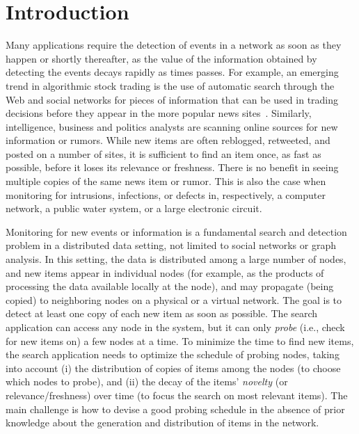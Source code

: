 \section{Introduction}\label{sec:introduction}
Many applications require the detection of events in a network as soon as they
happen or shortly thereafter, as the value of the information obtained by
detecting the events decays rapidly as times passes. For example, an emerging
trend in algorithmic stock trading is the use of automatic search through the
Web and social networks for pieces of information that can be used in trading
decisions before they appear in the more popular news
sites~\citep{Delaney2009,latar2015robot,wallstreet2015,McKinney2011}. Similarly,
intelligence, business and politics analysts are scanning online sources for new
information or rumors. While new items are often reblogged, retweeted, and
posted on a number of sites, it is sufficient to find an item once, as fast as
possible, before it loses its relevance or freshness. There is no benefit in seeing multiple
copies of the same news item or rumor. This is also the case when monitoring for
intrusions, infections, or defects in, respectively, a computer network, a
public water system, or a large electronic circuit.

Monitoring for new events or information is a fundamental search and detection
problem in a distributed data setting, not limited to social networks or graph
analysis. In this setting, the data is distributed among a large number of
nodes, and new items appear in individual nodes (for example, as the products of
processing the data available locally at the node), and may propagate (being
copied) to neighboring nodes on a physical or a virtual network. The goal is to
detect at least one copy of each new item as soon as possible. The search
application can access any node in the system, but it can only \emph{probe}
(i.e., check for new items on) a few nodes at a time. To minimize the time to
find new items, the search application needs to optimize the schedule of probing
nodes, taking into account (i) the distribution of copies of items among the
nodes (to choose which nodes to probe), and (ii) the decay of the items'
\emph{novelty} (or relevance/freshness) over time (to focus the search on most
relevant items). The main challenge is how to devise a good probing schedule in
the absence of prior knowledge about the generation and distribution of items in
the network.


